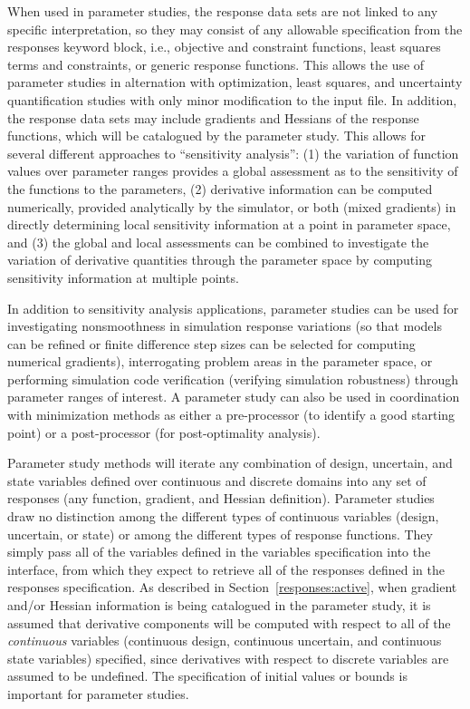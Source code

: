 When used in parameter studies, the response data sets are not linked
to any specific interpretation, so they may consist of any allowable
specification from the responses keyword block, i.e., objective and
constraint functions, least squares terms and constraints, or generic
response functions. This allows the use of parameter studies in
alternation with optimization, least squares, and uncertainty
quantification studies with only minor modification to the input
file. In addition, the response data sets may include gradients and
Hessians of the response functions, which will be catalogued by the
parameter study.  This allows for several different approaches to
``sensitivity analysis'': (1) the variation of function values over
parameter ranges provides a global assessment as to the sensitivity of
the functions to the parameters, (2) derivative information can be
computed numerically, provided analytically by the simulator, or both
(mixed gradients) in directly determining local sensitivity
information at a point in parameter space, and (3) the global and
local assessments can be combined to investigate the variation of
derivative quantities through the parameter space by computing
sensitivity information at multiple points.

In addition to sensitivity analysis applications, parameter studies
can be used for investigating nonsmoothness in simulation response
variations (so that models can be refined or finite difference step
sizes can be selected for computing numerical gradients),
interrogating problem areas in the parameter space, or performing
simulation code verification (verifying simulation robustness) through
parameter ranges of interest. A parameter study can also be used in
coordination with minimization methods as either a pre-processor (to
identify a good starting point) or a post-processor (for
post-optimality analysis).

Parameter study methods will iterate any combination of design,
uncertain, and state variables defined over continuous and discrete
domains into any set of responses (any function, gradient, and Hessian
definition). Parameter studies draw no distinction among the different
types of continuous variables (design, uncertain, or state) or among
the different types of response functions. They simply pass all of the
variables defined in the variables specification into the interface,
from which they expect to retrieve all of the responses defined in the
responses specification. As described in
Section~\ref{responses:active}, when gradient and/or Hessian
information is being catalogued in the parameter study, it is assumed
that derivative components will be computed with respect to all of the
\emph{continuous} variables (continuous design, continuous uncertain,
and continuous state variables) specified, since derivatives with
respect to discrete variables are assumed to be undefined.  The
specification of initial values or bounds is important for parameter
studies.

